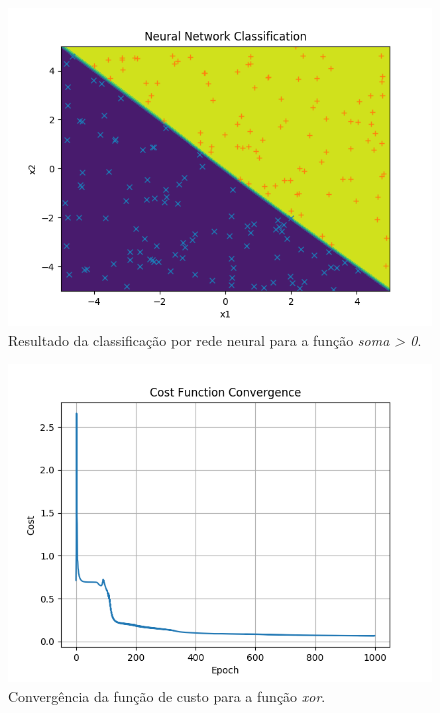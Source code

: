 \documentclass[conference]{IEEEtran}
\begin{document}
\begin{figure}[htbp]
\centering
\centerline{\includegraphics[scale=0.5]{imagens/sum_gt_zero/neural_net_classification.png}}
\caption{Resultado da classificação por rede neural para a função \textit{soma > 0}.}
\label{sum_gt_zero/neural_net_classification}
\end{figure} 

\begin{figure}[htbp]
\centering
\centerline{\includegraphics[scale=0.5]{imagens/xor/cost_function_convergence.png}}
\caption{Convergência da função de custo para a função \textit{xor}.}
\label{xor/cost_function_convergence}
\end{figure}
\end{document}

